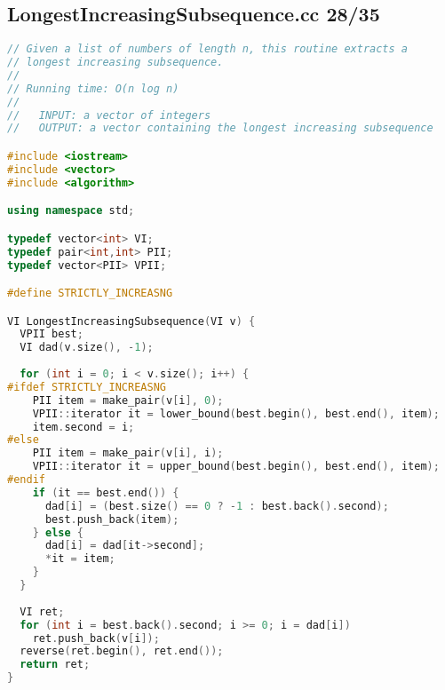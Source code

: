 \subsection{LongestIncreasingSubsequence.cc 28/35}
\begin{lstlisting}[language=C++]
// Given a list of numbers of length n, this routine extracts a 
// longest increasing subsequence.
//
// Running time: O(n log n)
//
//   INPUT: a vector of integers
//   OUTPUT: a vector containing the longest increasing subsequence

#include <iostream>
#include <vector>
#include <algorithm>

using namespace std;

typedef vector<int> VI;
typedef pair<int,int> PII;
typedef vector<PII> VPII;

#define STRICTLY_INCREASNG

VI LongestIncreasingSubsequence(VI v) {
  VPII best;
  VI dad(v.size(), -1);
  
  for (int i = 0; i < v.size(); i++) {
#ifdef STRICTLY_INCREASNG
    PII item = make_pair(v[i], 0);
    VPII::iterator it = lower_bound(best.begin(), best.end(), item);
    item.second = i;
#else
    PII item = make_pair(v[i], i);
    VPII::iterator it = upper_bound(best.begin(), best.end(), item);
#endif
    if (it == best.end()) {
      dad[i] = (best.size() == 0 ? -1 : best.back().second);
      best.push_back(item);
    } else {
      dad[i] = dad[it->second];
      *it = item;
    }
  }
  
  VI ret;
  for (int i = best.back().second; i >= 0; i = dad[i])
    ret.push_back(v[i]);
  reverse(ret.begin(), ret.end());
  return ret;
}

\end{lstlisting}
